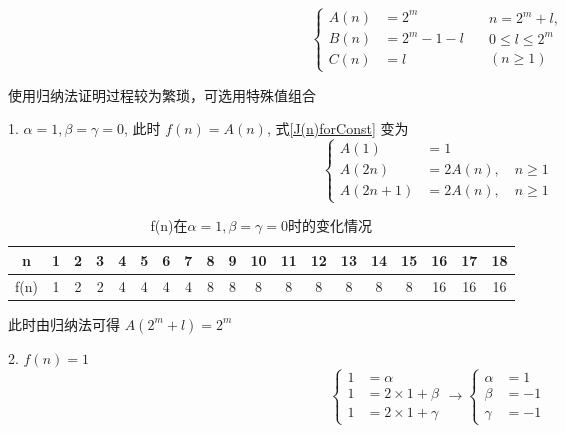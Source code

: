 \documentclass[mode=geye]{elegantnote}
\begin{document}
\begin{equation}
	\left\{
	\begin{aligned}
		A(n) &= 2^m\\
		B(n) &= 2^m-1-l\\
		C(n) &= l
	\end{aligned}
	\right.\quad
	\begin{aligned}
    	n=2^m+l, \\ 
		0\leqslant l \leqslant 2^m \\
		(n\geqslant 1)
	\end{aligned}
\end{equation}

使用归纳法证明过程较为繁琐，可选用特殊值组合

1. $ \alpha =1, \beta=\gamma = 0 $, 此时 $ f(n) = A(n) $, 式\ref{J(n)forConst} 变为
\begin{equation*}
	\left\{
	\begin{aligned}
		A(1)&=1\\
		A(2n)   &= 2A(n),  \quad n\geqslant 1\\
		A(2n+1) &= 2A(n),  \quad n\geqslant 1
	\end{aligned}
	\right.
\end{equation*}

\begin{table}[htbp]
	\centering
	\small
	\caption{f(n)在$ \alpha =1, \beta=\gamma = 0 $时的变化情况}
	\begin{tabular}{c|cccccccccccccccccc}
		\toprule
		n   & 1 & 2 & 3 & 4 & 5 & 6 & 7 & 8 & 9 & 10 & 11 & 12 & 13 & 14 & 15 & 16 & 17 & 18 \\
		\midrule
		f(n)& 1 & 2 & 2 & 4 & 4 & 4 & 4 & 8 & 8 &  8 &  8 &  8 &  8 &  8 &  8 & 16 & 16 & 16 \\
		\bottomrule
	\end{tabular}%
	\label{tab:fncase1}%
\end{table}%

此时由归纳法可得 $ A(2^m+l)=2^m $

2. $ f(n) = 1 $
\begin{equation*}
	\left\{
	\begin{aligned}
		1 &= \alpha             \\
		1 &= 2\times 1 + \beta  \\
		1 &= 2\times 1 + \gamma 
	\end{aligned}
	\right.
	\rightarrow
	\left\{
	\begin{aligned}
		\alpha &= 1  \\
		\beta  &= -1 \\ 
		\gamma &= -1
	\end{aligned}
	\right.	
\end{equation*}
\end{document}
